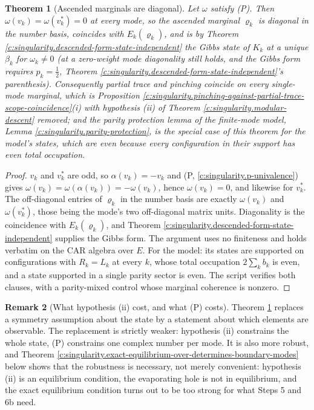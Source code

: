 \documentclass[11pt]{article}
\newtheorem{theorem}{Theorem}[section]
\theoremstyle{definition}
\newtheorem{remark}[theorem]{Remark}
\theoremstyle{plain}
\begin{document}
\begin{theorem}[Ascended marginals are diagonal]\label{c:singularity.ascended-marginals-are-diagonal}
Let $\omega$ satisfy (P). Then $\omega(v_k) = \omega(v_k^{*}) = 0$ at every mode, so the ascended marginal $\varrho_k$ is diagonal in the number basis, coincides with $E_k(\varrho_k)$, and is by Theorem \ref{c:singularity.descended-form-state-independent} the Gibbs state of $K_k$ at a unique $\beta_k$ for $\omega_k \neq 0$ (at a zero-weight mode diagonality still holds, and the Gibbs form requires $p_k = \tfrac12$, Theorem \ref{c:singularity.descended-form-state-independent}'s parenthesis). Consequently partial trace and pinching coincide on every single-mode marginal, which is Proposition \ref{c:singularity.pinching-against-partial-trace-scope-coincidence}(i) with hypothesis (ii) of Theorem \ref{c:singularity.modular-descent} removed; and the parity protection lemma of the finite-mode model, Lemma \ref{c:singularity.parity-protection}, is the special case of this theorem for the model's states, which are even because every configuration in their support has even total occupation.
\end{theorem}
\begin{proof}
$v_k$ and $v_k^{*}$ are odd, so $\alpha(v_k) = -v_k$ and (P, \ref{c:singularity.p-univalence}) gives $\omega(v_k) = \omega(\alpha(v_k)) = -\omega(v_k)$, hence $\omega(v_k) = 0$, and likewise for $v_k^{*}$. The off-diagonal entries of $\varrho_k$ in the number basis are exactly $\omega(v_k)$ and $\omega(v_k^{*})$, those being the mode's two off-diagonal matrix units. Diagonality is the coincidence with $E_k(\varrho_k)$, and Theorem \ref{c:singularity.descended-form-state-independent} supplies the Gibbs form. The argument uses no finiteness and holds verbatim on the CAR algebra over $E$. For the model: its states are supported on configurations with $R_k = L_k$ at every $k$, whose total occupation $2\sum_k b_k$ is even, and a state supported in a single parity sector is even. The script verifies both clauses, with a parity-mixed control whose marginal coherence is nonzero.

\end{proof}

\begin{remark}[What hypothesis (ii) cost, and what (P) costs]\label{c:note.singularity.what-hypothesis-ii-cost-what-p}
Theorem \ref{c:singularity.ascended-marginals-are-diagonal} replaces a symmetry assumption about the state by a statement about which elements are observable. The replacement is strictly weaker: hypothesis (ii) constrains the whole state, (P) constrains one complex number per mode. It is also more robust, and Theorem \ref{c:singularity.exact-equilibrium-over-determines-boundary-modes} below shows that the robustness is necessary, not merely convenient: hypothesis (ii) is an equilibrium condition, the evaporating hole is not in equilibrium, and the exact equilibrium condition turns out to be too strong for what Steps 5 and 6b need.
\end{remark}
\end{document}
